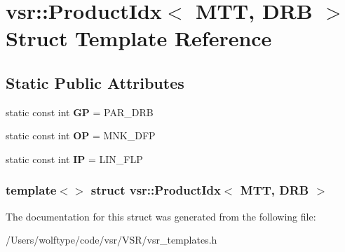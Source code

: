 \hypertarget{structvsr_1_1_product_idx_3_01_m_t_t_00_01_d_r_b_01_4}{\section{vsr\-:\-:Product\-Idx$<$ M\-T\-T, D\-R\-B $>$ Struct Template Reference}
\label{structvsr_1_1_product_idx_3_01_m_t_t_00_01_d_r_b_01_4}
}
\subsection*{Static Public Attributes}
\begin{DoxyCompactItemize}
\item 
\hypertarget{structvsr_1_1_product_idx_3_01_m_t_t_00_01_d_r_b_01_4_a2c7f8ded72794d1f45f2f61555d6eb3a}{static const int {\bfseries G\-P} = P\-A\-R\-\_\-\-D\-R\-B}\label{structvsr_1_1_product_idx_3_01_m_t_t_00_01_d_r_b_01_4_a2c7f8ded72794d1f45f2f61555d6eb3a}

\item 
\hypertarget{structvsr_1_1_product_idx_3_01_m_t_t_00_01_d_r_b_01_4_a186a75d7b7be93bcff329352254563c5}{static const int {\bfseries O\-P} = M\-N\-K\-\_\-\-D\-F\-P}\label{structvsr_1_1_product_idx_3_01_m_t_t_00_01_d_r_b_01_4_a186a75d7b7be93bcff329352254563c5}

\item 
\hypertarget{structvsr_1_1_product_idx_3_01_m_t_t_00_01_d_r_b_01_4_a3da095a53b78b2730cc2ac1cafdfc0ec}{static const int {\bfseries I\-P} = L\-I\-N\-\_\-\-F\-L\-P}\label{structvsr_1_1_product_idx_3_01_m_t_t_00_01_d_r_b_01_4_a3da095a53b78b2730cc2ac1cafdfc0ec}

\end{DoxyCompactItemize}
\subsubsection*{template$<$$>$ struct vsr\-::\-Product\-Idx$<$ M\-T\-T, D\-R\-B $>$}



The documentation for this struct was generated from the following file\-:\begin{DoxyCompactItemize}
\item 
/\-Users/wolftype/code/vsr/\-V\-S\-R/vsr\-\_\-templates.\-h\end{DoxyCompactItemize}
